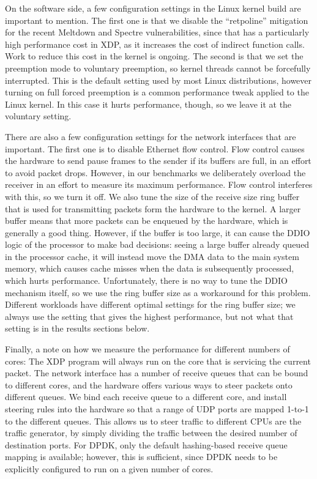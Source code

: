 \documentclass[10pt,sigconf]{acmart}
\begin{document}
On the software side, a few configuration settings in the Linux kernel build are
important to mention. The first one is that we disable the ``retpoline''
mitigation for the recent Meltdown and Spectre vulnerabilities, since that has a
particularly high performance cost in XDP, as it increases the cost of indirect
function calls. Work to reduce this cost in the kernel is ongoing. The second is
that we set the preemption mode to voluntary preemption, so kernel threads
cannot be forcefully interrupted. This is the default setting used by most Linux
distributions, however turning on full forced preemption is a common performance
tweak applied to the Linux kernel. In this case it hurts performance, though, so
we leave it at the voluntary setting.

There are also a few configuration settings for the network interfaces that are
important. The first one is to disable Ethernet flow control. Flow control
causes the hardware to send pause frames to the sender if its buffers are full,
in an effort to avoid packet drops. However, in our benchmarks we deliberately
overload the receiver in an effort to measure its maximum performance. Flow
control interferes with this, so we turn it off. We also tune the size of the
receive size ring buffer that is used for transmitting packets form the hardware
to the kernel. A larger buffer means that more packets can be enqueued by the
hardware, which is generally a good thing. However, if the buffer is too large,
it can cause the DDIO logic of the processor to make bad decisions: seeing a
large buffer already queued in the processor cache, it will instead move the DMA
data to the main system memory, which causes cache misses when the data is
subsequently processed, which hurts performance. Unfortunately, there is no way
to tune the DDIO mechanism itself, so we use the ring buffer size as a
workaround for this problem. Different workloads have different optimal settings
for the ring buffer size; we always use the setting that gives the highest
performance, but not what that setting is in the results sections below.

Finally, a note on how we measure the performance for different numbers of
cores: The XDP program will always run on the core that is servicing the current
packet. The network interface has a number of receive queues that can be bound
to different cores, and the hardware offers various ways to steer packets onto
different queues. We bind each receive queue to a different core, and install
steering rules into the hardware so that a range of UDP ports are mapped 1-to-1
to the different queues. This allows us to steer traffic to different CPUs are
the traffic generator, by simply dividing the traffic between the desired number
of destination ports. For DPDK, only the default hashing-based receive queue
mapping is available; however, this is sufficient, since DPDK needs to be
explicitly configured to run on a given number of cores.
\end{document}
